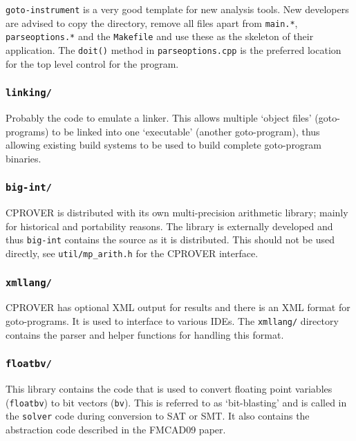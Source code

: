 \documentclass{article}
\newcommand{\dir}[1]{\texttt{#1}}
\newcommand{\file}[1]{\texttt{#1}}
\newcommand{\code}[1]{\texttt{#1}}
\newcommand{\prog}[1]{\texttt{#1}}
\begin{document}
\prog{goto-instrument} is a very good template for new analysis
tools.  New developers are advised to copy the directory, remove all
files apart from \file{main.*}, \file{parseoptions.*} and the
\file{Makefile} and use these as the skeleton of their application.
The \code{doit()} method in \file{parseoptions.cpp} is the preferred
location for the top level control for the program.



\subsubsection{\dir{linking/}}

Probably the code to emulate a linker.  This allows multiple `object
files' (goto-programs) to be linked into one `executable' (another
goto-program), thus allowing existing build systems to be used to
build complete goto-program binaries.


\subsubsection{\dir{big-int/}}

CPROVER is distributed with its own multi-precision arithmetic
library; mainly for historical and portability reasons.  The library is externally
developed and thus \dir{big-int} contains the source as it is
distributed.  This should not be used directly, see
\file{util/mp\_arith.h} for the CPROVER interface.



\subsubsection{\dir{xmllang/}}

CPROVER has optional XML output for results and there is an XML format
for goto-programs.  It is used to interface to various IDEs.  The
\dir{xmllang/} directory contains the parser and helper functions for
handling this format.



\subsubsection{\dir{floatbv/}}

This library contains the code that is used to convert floating point
variables (\code{floatbv}) to bit vectors (\code{bv}).  This is
referred to as `bit-blasting' and is called in the \dir{solver} code
during conversion to SAT or SMT.  It also contains the abstraction
code described in the FMCAD09 paper.
\end{document}
